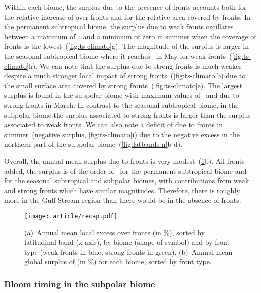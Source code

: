 Within each biome, the surplus  due to the presence of fronts accounts both for the relative increase of  over fronts and for the relative area covered by fronts.
In the permanent subtropical biome, the surplus due to weak fronts oscillates between a maximum of~, and a minimum of zero in summer when the coverage of fronts is the lowest~(\cref{fig:ts-climato}g).
The magnitude of the surplus is larger in the seasonal subtropical biome where it reaches~ in May for weak fronts~(\cref{fig:ts-climato}h).
We can note that the surplus due to strong fronts is much weaker despite a much stronger local impact of strong fronts~(\cref{fig:ts-climato}b) due to the small surface area covered by strong fronts~(\cref{fig:ts-climato}e).
The largest surplus is found in the subpolar biome with maximum values of~ and due to strong fronts in March.
In contrast to the seasonal subtropical biome, in the subpolar biome the surplus associated to strong fronts is larger than the surplus associated to weak fronts.
We can also note a deficit of  due to fronts in summer~(negative surplus, \cref{fig:ts-climato}i) due to the negative excess in the northern part of the subpolar biome~(\cref{fig:latbands-n}b-d).

Overall, the annual mean  surplus due to fronts is very modest~(\cref{fig:recap}b).
All fronts added, the surplus is of the order of~ for the permanent subtropical biome and~ for the seasonal subtropical and subpolar biomes, with contributions from weak and strong fronts which have similar magnitudes.
Therefore, there is roughly~ more  in the Gulf Stream region than there would be in the absence of fronts.

\begin{figure}
  \centering
  \texttt{[image: article/recap.pdf]}
  \caption[Recap of local and global impact of fronts on ]{%
    (a)~Annual mean local   excess over fronts (in \%), sorted by latitudinal band (x-axis),  by biome (shape of symbol) and by front type (weak fronts in blue, strong fronts in green).
    (b)~Annual mean global surplus of  (in \%) for each biome, sorted by front type.
  }%
  \label{fig:recap}
\end{figure}


\subsubsection{Bloom timing in the subpolar biome}

